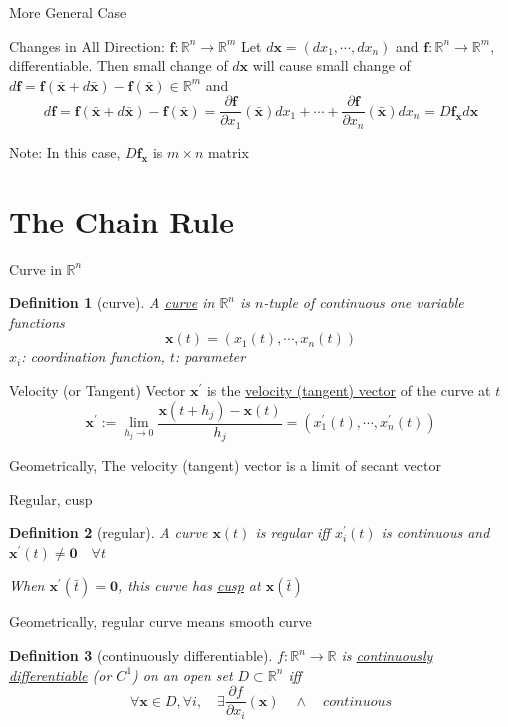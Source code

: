 \documentclass[final]{beamer}
\newtheorem{defn}{Definition}
\newcommand{\bb}{\mathbb}
\newcommand{\bd}{\mathbf}
\newcommand{\p}{\partial}
\begin{document}
\begin{frame}[t]{More General Case}
	\begin{block}
		{Changes in All Direction: $\bd f:\bb{R}^n\rightarrow \bb{R}^m$}
		Let $d \bd x = (d x_1, \cdots, d x_n)$ and $\bd f:\bb{R}^n\rightarrow\bb{R}^m$, differentiable. Then small change of $d\bd x$ will cause small change of $d\bd f=\bd f(\bar{\bd x} + d \bar{\bd x}) - \bd f(\bar{\bd x})\in\bb{R}^m$ and \[
			d\bd f = \bd f(\bar{\bd x} + d \bar{\bd x}) - \bd f(\bar{\bd x}) = \frac{\p \bd f}{\p x_1}(\bar{\bd x})dx_1 + \cdots +\frac{\p \bd f}{\p x_n}(\bar{\bd x})dx_n= D\bd f_{\bd x} d\bd x
		\]
	\end{block}
	Note: In this case, $D\bd f_{\bd x}$ is $m\times n$ matrix
\end{frame}
\section{The Chain Rule} %
\label{sec:the_chain_rule}
\begin{frame}[t]{Curve in $\bb{R}^n$}
	\begin{defn}
		[curve] A \uline{curve} in $\bb{R}^n$ is $n$-tuple of continuous one variable functions\[
			\bd x(t) = (x_1(t),\cdots,x_n(t))
		\]
		$x_i$: coordination function, $t$: parameter
	\end{defn}
	\begin{block}
		{Velocity (or Tangent) Vector}
		$\bd{x}^\prime$ is the \uline{velocity (tangent) vector} of the curve at $t$\[
			\bd{x}^\prime := \lim_{h_j\rightarrow 0}\frac{\bd{x}(t+h_j)-\bd{x}(t)}{h_j}=(x_1^\prime(t),\cdots,x_n^\prime(t))
		\]
	\end{block}
	Geometrically, The velocity (tangent) vector is a limit of secant vector
\end{frame}
\begin{frame}[t]{Regular, cusp}
	\begin{defn}
		[regular] A curve $\bd x(t)$ is regular iff $x_i^\prime(t) $ is continuous and $\bd x^\prime(t)\neq \bd{0}\quad \forall t$

		When $\bd x^\prime(\bar t) = \bd{0}$, this curve has \uline{cusp} at $\bd{x}(\bar t)$
	\end{defn}
	Geometrically, regular curve means smooth curve

	\begin{defn}
		[continuously differentiable] $f:\bb{R}^n\rightarrow\bb{R}$ is \uline{continuously differentiable} (or $C^1$) on an open set $ D\subset\bb{R}^n$ iff \[
			\forall\bd x\in D, \forall i, \quad \exists \frac{\p f}{\p x_i}(\bd x) \quad\land\quad continuous
		\]
	\end{defn}
\end{frame}
\end{document}

